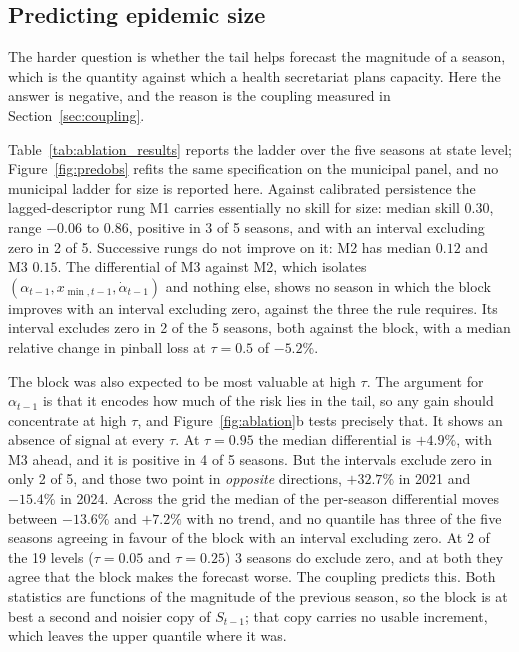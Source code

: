 \documentclass[english,10pt,b5paper]{article}
\begin{document}
\subsection{Predicting epidemic size}
\label{sec:prediction}

The harder question is whether the tail helps forecast the magnitude of a season,
which is the quantity against which a health secretariat plans capacity. Here the
answer is negative, and the reason is the coupling measured in
Section~\ref{sec:coupling}.

Table~\ref{tab:ablation_results} reports the ladder over the five seasons at
state level; Figure~\ref{fig:predobs} refits the same specification on the
municipal panel, and no municipal ladder for size is reported here. Against
calibrated persistence the lagged-descriptor rung M1 carries essentially no
skill for size: median skill $0.30$, range $-0.06$ to $0.86$, positive in 3 of
5 seasons, and with an interval excluding zero in 2 of 5. Successive rungs do
not improve on it: M2 has median $0.12$ and M3 $0.15$. The differential of M3
against M2, which isolates $(\alpha_{t-1}, x_{\min,t-1}, \dot\alpha_{t-1})$
and nothing else, shows no season in which the block improves with an interval
excluding zero, against the three the rule requires. Its interval excludes
zero in 2 of the 5 seasons, both against the block, with a median relative
change in pinball loss at $\tau=0.5$ of $-5.2\%$.



The block was also expected to be most valuable at high $\tau$. The argument
for $\alpha_{t-1}$ is that it encodes how much of the risk lies in the tail,
so any gain should concentrate at high $\tau$, and Figure~\ref{fig:ablation}b
tests precisely that. It shows an absence of signal at every $\tau$. At
$\tau=0.95$ the median differential is $+4.9\%$, with M3 ahead, and it is
positive in 4 of 5 seasons. But the intervals exclude zero in only 2 of 5, and
those two point in \emph{opposite} directions, $+32.7\%$ in 2021 and $-15.4\%$
in 2024. Across the grid the median of the per-season differential moves
between $-13.6\%$ and $+7.2\%$ with no trend, and no quantile has three of the
five seasons agreeing in favour of the block with an interval excluding zero.
At 2 of the 19 levels ($\tau=0.05$ and $\tau=0.25$) 3 seasons do exclude zero,
and at both they agree that the block makes the forecast worse. The coupling
predicts this. Both statistics are functions of the magnitude of the previous
season, so the block is at best a second and noisier copy of $S_{t-1}$; that
copy carries no usable increment, which leaves the upper quantile where it
was.
\end{document}
